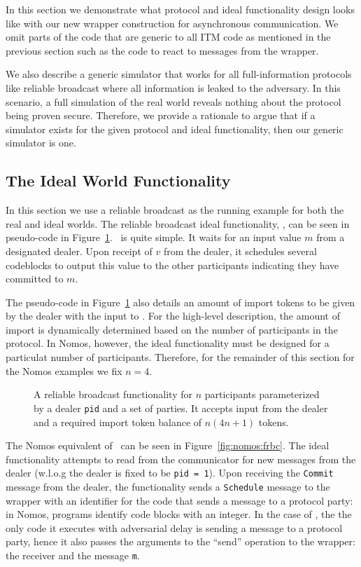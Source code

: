 In this section we demonstrate what protocol and ideal functionality design looks like with our new wrapper construction for asynchronous communication.
We omit parts of the code that are generic to all ITM code as mentioned in the previous section such as the code to react to \Exec messages from the wrapper.

We also describe a generic simulator that works for all full-information protocols like reliable broadcast where all information is leaked to the adversary.
In this scenario, a full simulation of the real world reveals nothing about the protocol being proven secure. 
Therefore, we provide a rationale to argue that if a simulator exists for the given protocol and ideal functionality, then our generic simulator is one.

\subsection{The Ideal World Functionality \Frbc}
In this section we use a reliable broadcast as the running example for both the real and ideal worlds.
The reliable broadcast ideal functionality, \Frbc, can be seen in pseudo-code in Figure~\ref{fig:frbc}.
\Frbc~is quite simple.
It waits for an input value $m$ from a designated dealer. 
Upon receipt of $v$ from the dealer, it schedules several codeblocks to \Eventually output this value to the other participants indicating they have committed to $m$.

The pseudo-code in Figure~\ref{fig:frbc} also details an amount of import tokens to be given by the dealer with the input to \Frbc.
For the high-level description, the amount of import is dynamically determined based on the number of participants in the protocol.
In Nomos, however, the ideal functionality must be designed for a particulat number of participants.
Therefore, for the remainder of this section for the Nomos examples we fix $n=4$.

\begin{figure}

\caption{A reliable broadcast functionality for $n$ participants parameterized by a dealer \texttt{pid} and a set of parties. It accepts input from the dealer and a required import token balance of $n(4n + 1)$ tokens.}
\label{fig:frbc}
\end{figure}

The Nomos equivalent of \Frbc~can be seen in Figure~\ref{fig:nomos:frbc}.
The ideal functionality attempts to read from the communicator for new messages from the dealer (w.l.o.g the dealer is fixed to be \texttt{pid = 1}).
Upon receiving the \texttt{Commit} message from the dealer, the functionality sends a \texttt{Schedule} message to the wrapper with an identifier for the code that sends a message to a protocol party: in Nomos, programs identify code blocks with an integer. 
In the case of \Frbc, the the only code it executes with adversarial delay is sending a message to a protocol party, hence it also passes the arguments to the ``send'' operation to the wrapper: the receiver and the message \texttt{m}.

